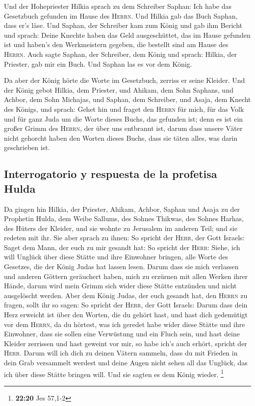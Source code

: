 Und der Hohepriester Hilkia sprach zu dem Schreiber
Saphan: Ich habe das Gesetzbuch gefunden im Hause des \textsc{Herrn}.
Und Hilkia gab das Buch Saphan, dass er's läse.  Und
Saphan, der Schreiber kam zum König und gab ihm Bericht und sprach:
Deine Knechte haben das Geld ausgeschüttet, das im Hause gefunden ist
und haben's den Werkmeistern gegeben, die bestellt sind am Hause des
\textsc{Herrn}.  Auch sagte Saphan, der Schreiber, dem
König und sprach: Hilkia, der Priester, gab mir ein Buch. Und Saphan las
es vor dem König.

 Da aber der König hörte die Worte im Gesetzbuch, zerriss
er seine Kleider.  Und der König gebot Hilkia, dem
Priester, und Ahikam, dem Sohn Saphans, und Achbor, dem Sohn Michajas,
und Saphan, dem Schreiber, und Asaja, dem Knecht des Königs, und sprach:
 Gehet hin und fraget den \textsc{Herrn} für mich, für
das Volk und für ganz Juda um die Worte dieses Buchs, das gefunden ist;
denn es ist ein großer Grimm des \textsc{Herrn}, der über uns entbrannt
ist, darum dass unsere Väter nicht gehorcht haben den Worten dieses
Buchs, dass sie täten alles, was darin geschrieben ist.

\hypertarget{interrogatorio-y-respuesta-de-la-profetisa-hulda}{%
\subsection{Interrogatorio y respuesta de la profetisa
Hulda}\label{interrogatorio-y-respuesta-de-la-profetisa-hulda}}

 Da gingen hin Hilkia, der Priester, Ahikam, Achbor,
Saphan und Asaja zu der Prophetin Hulda, dem Weibe Sallums, des Sohnes
Thikwas, des Sohnes Harhas, des Hüters der Kleider, und sie wohnte zu
Jerusalem im anderen Teil; und sie redeten mit ihr.  Sie
aber sprach zu ihnen: So spricht der \textsc{Herr}, der Gott Israels:
Saget dem Mann, der euch zu mir gesandt hat:  So spricht
der \textsc{Herr}: Siehe, ich will Unglück über diese Stätte und ihre
Einwohner bringen, alle Worte des Gesetzes, die der König Judas hat
lassen lesen.  Darum dass sie mich verlassen und anderen
Göttern geräuchert haben, mich zu erzürnen mit allen Werken ihrer Hände,
darum wird mein Grimm sich wider diese Stätte entzünden und nicht
ausgelöscht werden.  Aber dem König Judas, der euch
gesandt hat, den \textsc{Herrn} zu fragen, sollt ihr so sagen: So
spricht der \textsc{Herr}, der Gott Israels:  Darum dass
dein Herz erweicht ist über den Worten, die du gehört hast, und hast
dich gedemütigt vor dem \textsc{Herrn}, da du hörtest, was ich geredet
habe wider diese Stätte und ihre Einwohner, dass sie sollen eine
Verwüstung und ein Fluch sein, und hast deine Kleider zerrissen und hast
geweint vor mir, so habe ich's auch erhört, spricht der \textsc{Herr}.
 Darum will ich dich zu deinen Vätern sammeln, dass du
mit Frieden in dein Grab versammelt werdest und deine Augen nicht sehen
all das Unglück, das ich über diese Stätte bringen will. Und sie sagten
es dem König wieder. \footnote{\textbf{22:20} Jes 57,1-2}

